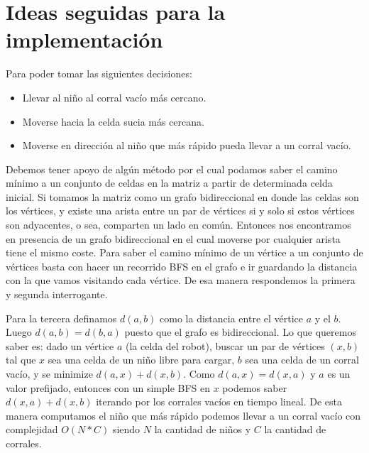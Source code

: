 \documentclass[]{article}
\begin{document}
\section{Ideas seguidas para la implementación}

\begin{flushleft}
	Para poder tomar las siguientes decisiones:
\end{flushleft}

\begin{itemize}
	\item Llevar al niño al corral vacío más cercano.
	\item Moverse hacia la celda sucia más cercana.
	\item Moverse en dirección al niño que más rápido pueda llevar a un corral vacío.
\end{itemize}

\begin{flushleft}
	Debemos tener apoyo de algún método por el cual podamos saber el camino mínimo a un conjunto de celdas en la matriz a partir de determinada celda inicial. Si tomamos la matriz como un grafo bidireccional en donde las celdas son los vértices, y existe una arista entre un par de vértices si y solo si estos vértices son adyacentes, o sea, comparten un lado en común. Entonces nos encontramos en presencia de un grafo bidireccional en el cual moverse por cualquier arista tiene el mismo coste. Para saber el camino mínimo de un vértice a un conjunto de vértices basta con
	hacer un recorrido BFS en el grafo e ir guardando la distancia con la que vamos visitando cada vértice. De esa manera respondemos la primera y segunda interrogante.
\end{flushleft}

\begin{flushleft}
	Para la tercera definamos $d(a, b)$ como la distancia entre el vértice $a$ y el $b$. Luego $d(a, b) = d(b, a)$ puesto que el grafo es bidireccional. Lo que queremos saber es: dado un vértice $a$ (la celda del robot), buscar un par de vértices $(x, b)$ tal que $x$ sea una celda de un niño libre para cargar, $b$ sea una celda de un corral vacío, y se minimize $d(a, x) + d(x, b)$. Como $d(a, x) = d(x, a)$ y $a$ es un valor prefijado, entonces con un simple BFS en $x$ podemos saber $d(x, a) + d(x, b)$ iterando por los corrales vacíos en tiempo lineal. De esta manera computamos el niño que más rápido podemos llevar a un corral vacío con complejidad $O(N * C)$ siendo $N$ la cantidad de niños y $C$ la cantidad de corrales.
\end{flushleft}
\end{document}
